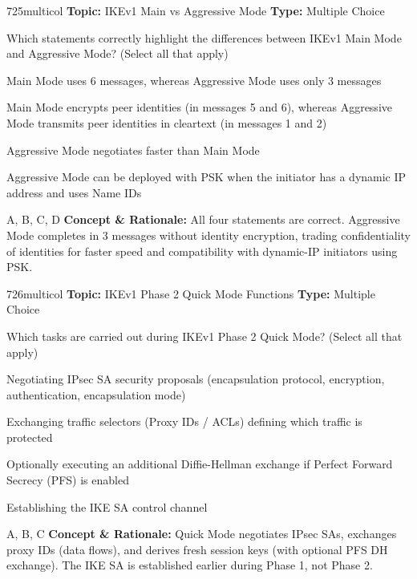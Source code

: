 \begin{qcard}{725}{multicol}
\textcolor{darkslate!75}{\small\textbf{Topic:} IKEv1 Main vs Aggressive Mode \hfill \textbf{Type:} Multiple Choice}\vspace{0.4em}\par
Which statements correctly highlight the differences between IKEv1 Main Mode and Aggressive Mode? (Select all that apply)
\begin{qoptions}
\item Main Mode uses 6 messages, whereas Aggressive Mode uses only 3 messages
\item Main Mode encrypts peer identities (in messages 5 and 6), whereas Aggressive Mode transmits peer identities in cleartext (in messages 1 and 2)
\item Aggressive Mode negotiates faster than Main Mode
\item Aggressive Mode can be deployed with PSK when the initiator has a dynamic IP address and uses Name IDs
\end{qoptions}
\end{qcard}
\nopagebreak
\begin{explainbox}{A, B, C, D}
\textbf{Concept \& Rationale:} All four statements are correct. Aggressive Mode completes in 3 messages without identity encryption, trading confidentiality of identities for faster speed and compatibility with dynamic-IP initiators using PSK.
\end{explainbox}

\begin{qcard}{726}{multicol}
\textcolor{darkslate!75}{\small\textbf{Topic:} IKEv1 Phase 2 Quick Mode Functions \hfill \textbf{Type:} Multiple Choice}\vspace{0.4em}\par
Which tasks are carried out during IKEv1 Phase 2 Quick Mode? (Select all that apply)
\begin{qoptions}
\item Negotiating IPsec SA security proposals (encapsulation protocol, encryption, authentication, encapsulation mode)
\item Exchanging traffic selectors (Proxy IDs / ACLs) defining which traffic is protected
\item Optionally executing an additional Diffie-Hellman exchange if Perfect Forward Secrecy (PFS) is enabled
\item Establishing the IKE SA control channel
\end{qoptions}
\end{qcard}
\nopagebreak
\begin{explainbox}{A, B, C}
\textbf{Concept \& Rationale:} Quick Mode negotiates IPsec SAs, exchanges proxy IDs (data flows), and derives fresh session keys (with optional PFS DH exchange). The IKE SA is established earlier during Phase 1, not Phase 2.
\end{explainbox}

